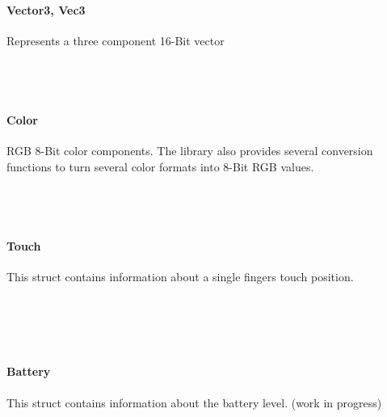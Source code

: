 \paragraph{Vector3, Vec3} Represents a three component 16-Bit vector \\

 \\

 \\

 \\

\label{APIRef_Types_color}
\paragraph{Color} RGB 8-Bit color components. The library also provides several conversion functions to turn several color formats into 8-Bit RGB values.\\

\\

\\

\\

\label{APIRef_Types_touch}
\paragraph{Touch} This struct contains information about a single fingers touch position. \\

 \\

 \\

 \\

 \\

\label{APIRef_Types_battery}
\paragraph{Battery} This struct contains information about the battery level. (work in progress)\\

